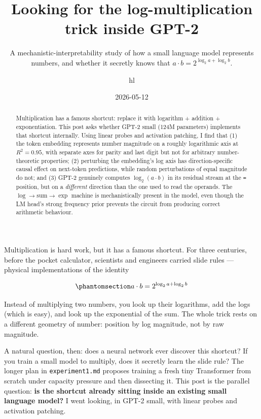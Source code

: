 \documentclass[
]{article}
\title{Looking for the log-multiplication trick inside GPT-2}
\subtitle{A mechanistic-interpretability study of how a small language
model represents numbers, and whether it secretly knows that
\(a \cdot b = 2^{\log_2 a + \log_2 b}\).}
\author{hl}
\date{2026-05-12}
\renewcommand*\contentsname{Table of contents}
\newcommand\contentsname{Table of contents}
\begin{document}
\maketitle
\begin{abstract}
Multiplication has a famous shortcut: replace it with logarithm +
addition + exponentiation. This post asks whether GPT-2 small (124M
parameters) implements that shortcut internally. Using linear probes and
activation patching, I find that (1) the token embedding represents
number magnitude on a roughly logarithmic axis at \(R^2 = 0.95\), with
separate axes for parity and last digit but not for arbitrary
number-theoretic properties; (2) perturbing the embedding's log axis has
direction-specific causal effect on next-token predictions, while random
perturbations of equal magnitude do not; and (3) GPT-2 genuinely
computes \(\log_2(a \cdot b)\) in its residual stream at the \texttt{=}
position, but on a \emph{different} direction than the one used to read
the operands. The \(\log \to \mathrm{sum} \to \exp\) machine is
mechanistically present in the model, even though the LM head's strong
frequency prior prevents the circuit from producing correct arithmetic
behaviour.
\end{abstract}

\renewcommand*\contentsname{Table of contents}
{
\setcounter{tocdepth}{3}
\tableofcontents
}

Multiplication is hard work, but it has a famous shortcut. For three
centuries, before the pocket calculator, scientists and engineers
carried slide rules --- physical implementations of the identity

\begin{equation}\protect\phantomsection\label{eq-shortcut}{
a \cdot b = 2^{\log_2 a + \log_2 b}
}\end{equation}

Instead of multiplying two numbers, you look up their logarithms, add
the logs (which is easy), and look up the exponential of the sum. The
whole trick rests on a different geometry of number: position by log
magnitude, not by raw magnitude.

A natural question, then: does a neural network ever discover this
shortcut? If you train a small model to multiply, does it secretly learn
the slide rule? The longer plan in \texttt{experiment1.md} proposes
training a fresh tiny Transformer from scratch under capacity pressure
and then dissecting it. This post is the parallel question: \textbf{is
the shortcut already sitting inside an existing small language model?} I
went looking, in GPT-2 small, with linear probes and activation
patching.
\end{document}
